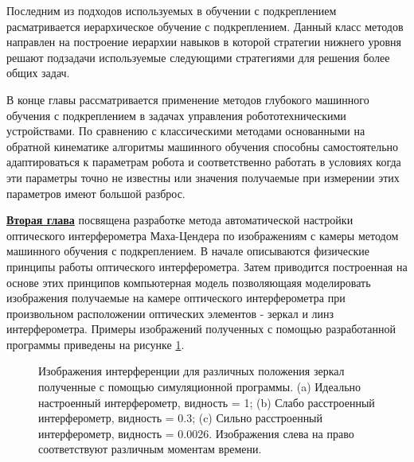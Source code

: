 Последним из подходов используемых в обучении с подкреплением расматривается иерархическое обучение с подкреплением. Данный класс методов направлен на построение иерархии навыков в которой стратегии нижнего уровня решают подзадачи используемые следующими стратегиями для решения более общих задач. 

В конце главы рассматривается применение методов глубокого машинного обучения с подкреплением в задачах управления робототехническими устройствами. По сравнению с классическими методами основанными на обратной кинематике алгоритмы машинного обучения способны самостоятельно адаптироваться к параметрам робота и соответственно работать в условиях когда эти параметры точно не известны или значения получаемые при измерении этих параметров имеют большой разброс. 

\underline{\textbf{Вторая глава}} посвящена разработке метода автоматической настройки оптического интерферометра Маха-Цендера по изображениям с камеры методом машинного обучения с подкреплением. В начале описываются физические принципы работы оптического интерферометра. Затем приводится построенная на основе этих принципов компьютерная модель позволяющаяя моделировать изображения получаемые на камере оптического интерферометра при произвольном расположении оптических элементов - зеркал и линз интерферометра. Примеры изображений полученных с помощью разработанной программы приведены на рисунке \ref{fig:visib_expl}. 

\begin{figure}[ht]
    \caption{
    Изображения интерференции для различных положения зеркал полученные с помощью симуляционной программы. (a) Идеально настроенный интерферометр, видность = 1; (b) Слабо расстроенный интерферометр, видность = 0.3; (c) Сильно расстроенный интерферометр, видность = 0.0026. Изображения слева на право соответствуют различным моментам времени.}
\label{fig:visib_expl}
\end{figure}

